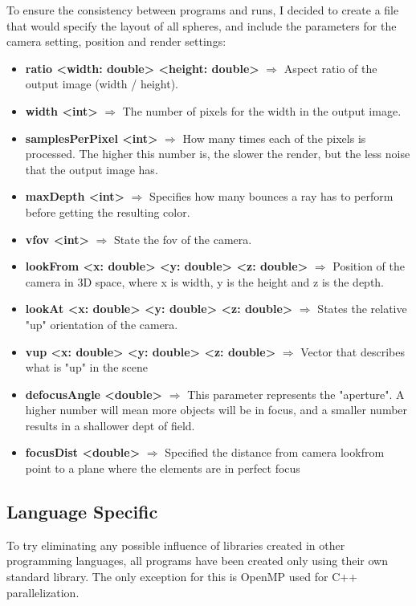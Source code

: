 To ensure the consistency between programs and runs, I decided to create a file that would specify the layout of all spheres, and include the parameters for the camera setting, position and render settings:
\begin{itemize}
    \item \textbf{ratio <width: double> <height: double>} $\Rightarrow{}$ Aspect ratio of the output image (width / height).
    \item \textbf{width <int>} $\Rightarrow{}$ The number of pixels for the width in the output image.
    \item \textbf{samplesPerPixel <int>} $\Rightarrow{}$ How many times each of the pixels is processed. The higher this number is, the slower the render, but the less noise that the output image has. %
    \item \textbf{maxDepth <int>} $\Rightarrow{}$ Specifies how many bounces a ray has to perform before getting the resulting color.
    \item \textbf{vfov <int>} $\Rightarrow{}$ State the \gls{fov} of the camera.
    \item \textbf{lookFrom <x: double> <y: double> <z: double>} $\Rightarrow{}$ Position of the camera in 3D space, where x is width, y is the height and z is the depth.
    \item \textbf{lookAt <x: double> <y: double> <z: double>} $\Rightarrow{}$ States the relative "up" orientation of the camera.
    \item \textbf{vup <x: double> <y: double> <z: double>} $\Rightarrow{}$ Vector that describes what is "up" in the scene
    \item \textbf{defocusAngle <double>} $\Rightarrow{}$ This parameter represents the "aperture". A higher number will mean more objects will be in focus, and a smaller number results in a shallower dept of field.
    \item \textbf{focusDist <double>} $\Rightarrow{}$ Specified the distance from camera lookfrom point to a plane where the elements are in perfect focus
\end{itemize}

\subsection{Language Specific}
To try eliminating any possible influence of libraries created in other programming languages, all programs have been created only using their own standard library. The only exception for this is OpenMP used for C++ parallelization.

